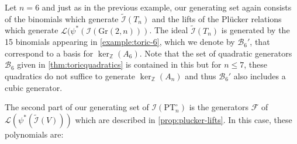 \documentclass[12pt, reqno]{amsart}
\numberwithin{equation}{section}
\theoremstyle{plain}
\theoremstyle{definition}
\newenvironment{example}
  {\pushQED{\qed}\renewcommand{\qedsymbol}{$\triangle$}\examplex}
  {\popQED\endexamplex}
\newcommand{\zz}{\mathbb{Z}}
\newcommand{\ci}{\mathcal{I}}
\newcommand{\cb}{\mathcal{B}}
\newcommand{\gr}{\mathrm{Gr}}
\begin{document}
\begin{example} \label{example:fullideal6}
Let $n = 6$ and just as in the previous example, our generating set again consists of the binomials which generate $\tilde{\ci}(T_n)$ and the lifts of the Pl\"ucker relations which generate $\mathcal{L}(\psi^\ast(\ci(\gr(2,n)))$. The ideal $\tilde{\ci}(T_n)$ is generated by the 15 binomials appearing in \cref{example:toric-6}, which we denote by $\cb_6'$, that correspond to a basis for $\ker_\zz(A_6)$. Note that the set of quadratic generators $\cb_6$ given in \cref{thm:toricquadratics} is contained in this but for $n \leq 7$, these quadratics do not suffice to generate $\ker_\zz(A_n)$ and thus $\cb_6'$ also includes a cubic generator.  

The second part of our generating set of $\ci(\mathrm{PT}_n^\circ)$ is the generators 
$\mathcal{F}$ of $\mathcal{L}(\psi^\ast(\tilde{\ci}(V)))$ which are described in \cref{prop:plucker-lifts}. In this case, these polynomials are:


\end{example}
\end{document}
